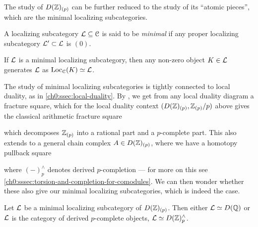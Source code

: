 The study of $D(\mathbb{Z})_{(p)}$ can be further reduced to the study of its ``atomic pieces'', which are the minimal localizing subcategories. 

\begin{definition}
    \label{ch0:def:minimal-localizing-subcategory}
    A localizing subcategory $\mathcal{L}\subseteq \EuScript{C}$ is said to be \emph{minimal} if any proper localizing subcategory $\mathcal{L}'\subset \mathcal{L}$ is $(0)$.  
\end{definition}

\begin{remark}
    If $\mathcal{L}$ is a minimal localizing subcategory, then any non-zero object $K\in \mathcal{L}$ generates $\mathcal{L}$ as $\operatorname{Loc}_{\EuScript{C}}(K)\simeq \mathcal{L}$.
\end{remark}

The study of minimal localizing subcategories is tightly connected to local duality, as in \cref{ch0:ssec:local-duality}. By \cite[2.26]{barthel-heard-valenzuela_2018}, we get from any local duality diagram a fracture square, which for the local duality context $(D(\mathbb{Z})_{(p)}, \mathbb{Z}_{(p)}/p)$ above gives the classical arithmetic fracture square
\begin{center}
\end{center}
which decomposes $\mathbb{Z}_{(p)}$ into a rational part and a $p$-complete part. This also extends to a general chain complex $A\in D(\mathbb{Z})_{(p)}$, where we have a homotopy pullback square 
\begin{center}
\end{center}
where $(-)_p^\wedge$ denotes derived $p$-completion --- for more on this see \cref{ch0:sssec:torsion-and-completion-for-comodules}. We can then wonder whether these also give our minimal localizing subcategories, which is indeed the case. 

\begin{proposition}
    Let $\mathcal{L}$ be a minimal localizing subcategory of $D(\mathbb{Z})_{(p)}$. Then either $\mathcal{L} \simeq D(\mathbb{Q})$ or $\mathcal{L}$ is the category of derived $p$-complete objects, $\mathcal{L}\simeq D(\mathbb{Z})^\wedge_p$.
\end{proposition}

